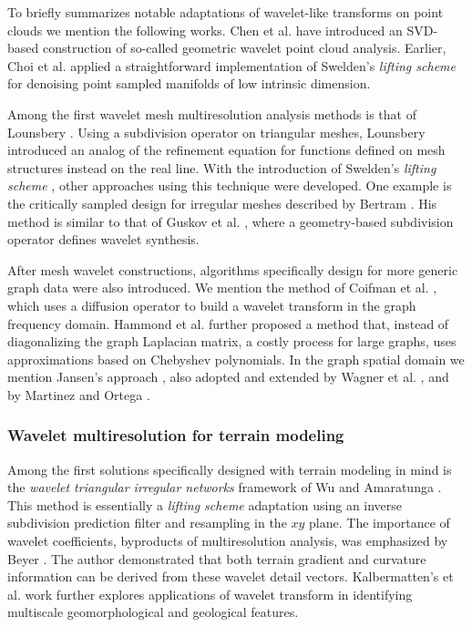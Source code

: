 \documentclass[graybox]{svmult}
\begin{document}
	To briefly summarizes notable adaptations of wavelet-like transforms on point clouds we mention the following works. Chen et al. \cite{Chen2010} have introduced an SVD-based construction of so-called geometric wavelet point cloud analysis. Earlier, Choi et al. \cite{Choi2005} applied a straightforward implementation of Swelden's \emph{lifting scheme} \cite{Sweldens1996} for denoising point sampled manifolds of low intrinsic dimension.
	
	Among the first wavelet mesh multiresolution analysis methods is that of Lounsbery \cite{Lounsbery1994}. Using a subdivision operator on triangular meshes, Lounsbery introduced an analog of the refinement equation for functions defined on mesh structures instead on the real line. With the introduction of Swelden's \emph{lifting scheme} \cite{Sweldens1996}, other approaches using this technique were developed. One example is the critically sampled design for irregular meshes described by Bertram \cite{Bertram2007}. His method is similar to that of Guskov et al. \cite{Guskov1999}, where a geometry-based subdivision operator defines wavelet synthesis.
	
	After mesh wavelet constructions, algorithms specifically design for more generic graph data were also introduced. We mention the method of Coifman et al. \cite{Coifman2006}, which uses a diffusion operator to build a wavelet transform in the graph frequency domain. Hammond et al. \cite{Hammond2011} further proposed a method that, instead of diagonalizing the graph Laplacian matrix, a costly process for large graphs, uses approximations based on Chebyshev polynomials. In the graph spatial domain we mention Jansen's approach \cite{Jansen2001, Jansen2013}, also adopted and extended by Wagner et al. \cite{Wagner2005}, and by Martinez and Ortega \cite{Martinez2011}.
	
	\subsubsection{Wavelet multiresolution for terrain modeling}
	Among the first solutions specifically designed with terrain modeling in mind is the \emph{wavelet triangular irregular networks} framework of Wu and Amaratunga \cite{WuA03}. This method is essentially a \emph{lifting scheme} adaptation using an inverse subdivision prediction filter and resampling in the $xy$ plane. The importance of wavelet coefficients, byproducts of multiresolution analysis, was emphasized by Beyer \cite{Beyer2003}. The author demonstrated that both terrain gradient and curvature information can be derived from these wavelet detail vectors. Kalbermatten's et al. \cite{Kalbermatten2012} work further explores applications of wavelet transform in identifying multiscale geomorphological and geological features.
	
\end{document}
